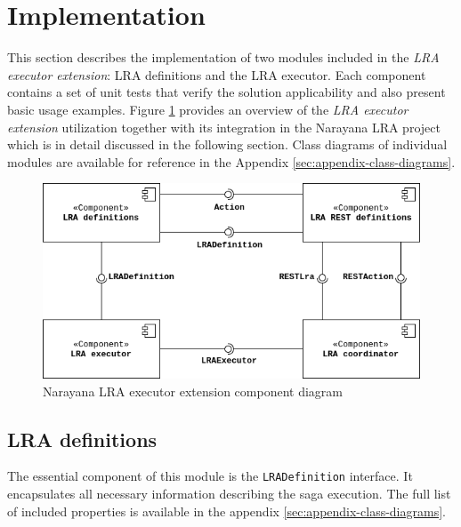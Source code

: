 \documentclass[oneside,
  digital, %
  table,   %
  lof,     %
  lot,     %
]{fithesis3}
\begin{document}
\section{Implementation}

This section describes the implementation of two modules included in the \textit{LRA executor extension}: LRA definitions and the LRA executor. Each component contains a set of unit tests that verify the solution applicability and also present basic usage examples. Figure \ref{fig:integration-component} provides an overview of the \textit{LRA executor extension} utilization together with its integration in the Narayana LRA project which is in detail discussed in the following section. Class diagrams of individual modules are available for reference in the Appendix \ref{sec:appendix-class-diagrams}.

\hfill \break

\begin{figure}[h]
    \begin{center}
        \includegraphics[width=1.0\textwidth]{images/componentDiagrams/narayana-integration-component.png}
    \end{center}
    \caption{Narayana LRA executor extension component diagram}
    \label{fig:integration-component}
\end{figure}


\subsection{LRA definitions}

The essential component of this module is the \texttt{LRADefinition} interface. It encapsulates all necessary information describing the saga execution. The full list of included properties is available in the appendix \ref{sec:appendix-class-diagrams}. 
\end{document}
